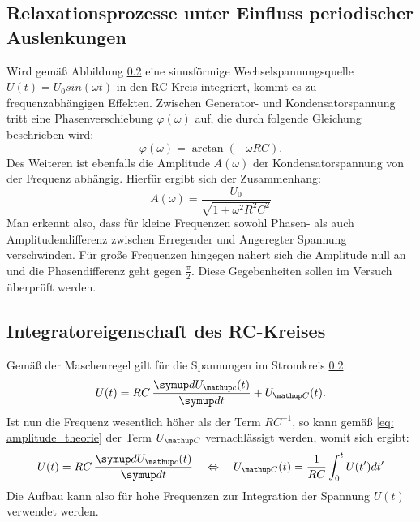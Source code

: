 \subsection{Relaxationsprozesse unter Einfluss periodischer Auslenkungen}
Wird gemäß Abbildung \ref{} eine sinusförmige Wechselspannungsquelle $U(t) = U_0sin(\omega t)$ in den RC-Kreis integriert, kommt es zu frequenzabhängigen
Effekten. Zwischen Generator- und Kondensatorspannung tritt eine Phasenverschiebung $\varphi(\omega)$ auf, die durch folgende Gleichung
beschrieben wird:
\begin{equation}
  \varphi(\omega) = \arctan(-\omega RC).
  \label{eq: phase_theorie}
\end{equation}
Des Weiteren ist ebenfalls die Amplitude $A(\omega)$ der Kondensatorspannung von der Frequenz abhängig. Hierfür ergibt sich der Zusammenhang:
\begin{equation}
  A(\omega) = \frac{U_0}{\sqrt{1 +\omega^2R^2C^2}}
  \label{eq: amplitude_theorie}
\end{equation}
Man erkennt also, dass für kleine Frequenzen sowohl Phasen- als auch Amplitudendifferenz zwischen Erregender und Angeregter Spannung verschwinden.
Für große Frequenzen hingegen nähert sich die Amplitude null an und die Phasendifferenz geht gegen $\frac{\pi}{2}$. Diese Gegebenheiten sollen
im Versuch überprüft werden.

\subsection{Integratoreigenschaft des RC-Kreises}
Gemäß der Maschenregel gilt für die Spannungen im Stromkreis \ref{}:
\begin{equation}
  U(t) = RC\,\frac{\dif{U\ua{c}(t)}}{\dif{t}} + U\ua{C}(t).
\end{equation}
Ist nun die Frequenz wesentlich höher als der Term $RC^{-1}$, so kann gemäß \eqref{eq: amplitude_theorie} der Term $U\ua{C}$ vernachlässigt werden, womit
sich ergibt:
\begin{equation}
  U(t) = RC\,\frac{\dif{U\ua{c}(t)}}{\dif{t}} \quad \Leftrightarrow \quad U\ua{C}(t) = \frac{1}{RC}\int_0^t U(t')dt'
\end{equation}
Die Aufbau kann also für hohe Frequenzen zur Integration der Spannung $U(t)$ verwendet werden. 
